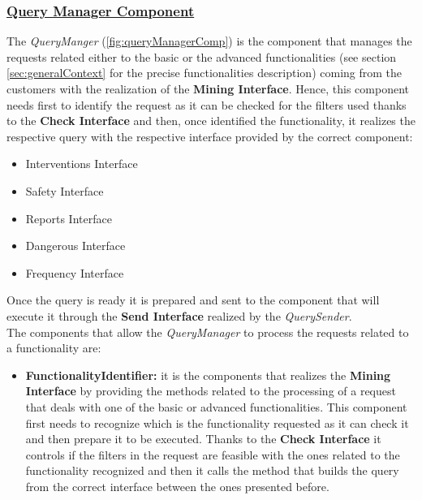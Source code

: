 		\subsubsection[Query Manager Component]{\hyperlink{toc}{Query Manager Component}}
			\label{sec:queryManagerComponent}
			
			The \emph{QueryManger} (\autoref{fig:queryManagerComp}) is the component that manages the requests related either to the basic or the advanced functionalities (see section \ref{sec:generalContext} for the precise functionalities description) coming from the customers with the realization of the \textbf{Mining Interface}. Hence, this component needs first to identify the request as it can be checked for the filters used thanks to the \textbf{Check Interface} and then, once identified the functionality, it realizes the respective query with the respective interface provided by the correct component:
			
			\begin{itemize}
				\item Interventions Interface
				\item Safety Interface
				\item Reports Interface
				\item Dangerous Interface
				\item Frequency Interface
			\end{itemize}
		
			Once the query is ready it is prepared and sent to the component that will execute it through the \textbf{Send Interface} realized by the \emph{QuerySender}.\\
			
			The components that allow the \emph{QueryManager} to process the requests related to a functionality are:
			
			\begin{itemize}
				\item \textbf{FunctionalityIdentifier:} it is the components that realizes the \textbf{Mining Interface} by providing the methods related to the processing of a request that deals with one of the basic or advanced functionalities. This component first needs to recognize which is the functionality requested as it can check it and then prepare it to be executed. Thanks to the \textbf{Check Interface} it controls if the filters in the request are feasible with the ones related to the functionality recognized and then it calls the method that builds the query from the correct interface between the ones presented before.
			\end{itemize}
			
